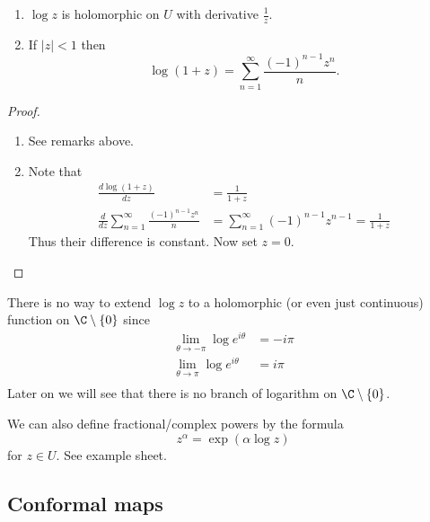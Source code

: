 \documentclass[a4paper]{article}
\begin{document}
\begin{proposition}\leavevmode
  \begin{enumerate}
  \item \(\log z\) is holomorphic on \(U\) with derivative \(\frac{1}{z}\).
  \item If \(|z| < 1\) then
    \[
      \log(1 + z) = \sum_{n = 1}^\infty \frac{(-1)^{n - 1}z^n}{n}.
    \]
  \end{enumerate}
\end{proposition}

\begin{proof}\leavevmode
  \begin{enumerate}
  \item See remarks above.
  \item Note that
    \begin{align*}
      \frac{d \log(1 + z)}{dz}
      &= \frac{1}{1 + z} \\
      \frac{d}{dz} \sum_{n = 1}^\infty \frac{(-1)^{n - 1}z^n}{n}
      &= \sum_{n = 1}^\infty (-1)^{n - 1}z^{n -1}
        = \frac{1}{1 + z}
    \end{align*}
    Thus their difference is constant. Now set \(z = 0\).
  \end{enumerate}
\end{proof}

\begin{remark}
  There is no way to extend \(\log z\) to a holomorphic (or even just continuous) function on \(\C \setminus \{0\}\) since
  \begin{align*}
    \lim_{\theta \to -\pi} \log e^{i\theta} &= -i\pi \\
    \lim_{\theta \to \pi} \log e^{i\theta} &= i\pi \\
  \end{align*}
  Later on we will see that there is no branch of logarithm on \(\C \setminus \{0\}\).
\end{remark}

We can also define fractional/complex powers by the formula
\[
  z^\alpha = \exp (\alpha \log z)
\]
for \(z \in U\). See example sheet.


\subsection{Conformal maps}
\end{document}
